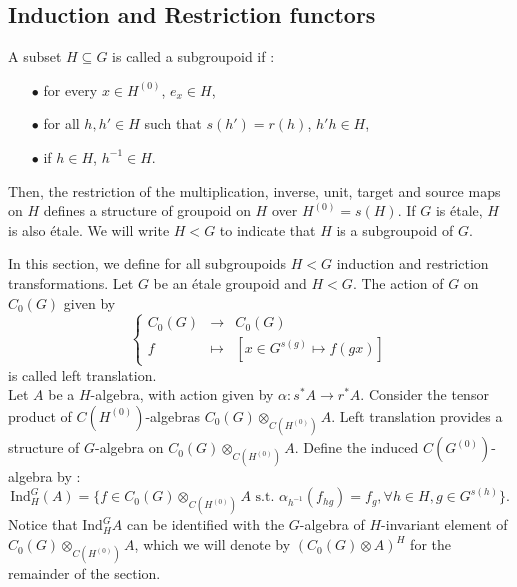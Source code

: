 \subsection{Induction and Restriction functors}

\begin{definition} A subset $H\subseteq G$ is called a subgroupoid if :
\begin{itemize}
\item[$\bullet$] for every $x\in H^{(0)}$, $e_x\in H$,
\item[$\bullet$] for all $h,h'\in H $ such that $s(h') = r(h)$, $h'h \in H$,
\item[$\bullet$] if $h\in H$, $h^{-1}\in H$.
\end{itemize}
Then, the restriction of the multiplication, inverse, unit, target and source maps on $H$ defines a structure of groupoid on $H$ over $H^{(0)} = s(H)$. If $G$ is étale, $H$ is also étale. We will write $H< G$ to indicate that $H$ is a subgroupoid of $G$.
\end{definition}

In this section, we define for all subgroupoids $H < G$ induction and restriction transformations. Let $G$ be an étale groupoid and $H<G$. The action of $G$ on $C_0(G)$ given by 
\[\left\{ \begin{array}{rcl}
C_0(G) & \rightarrow & C_0(G) \\
f & \mapsto  & [x\in G^{s(g)}\mapsto f(gx) ]
\end{array}\right.\] 
is called left translation.\\

Let $A$ be a $H$-algebra, with action given by $\alpha : s^*A \rightarrow r^* A$. Consider the tensor product of $C(H^{(0)})$-algebras $C_0(G)\otimes_{C(H^{(0)})} A$. Left translation provides a structure of $G$-algebra on $C_0(G)\otimes_{C(H^{(0)})} A$. Define the induced $C(G^{(0)})$-algebra by :
\[\text{Ind}_H^G (A) = \{f \in C_0(G)\otimes_{C(H^{(0)})} A \text{ s.t. } \alpha_{h^{-1}}(f_{hg}) = f_g,\forall h\in H,g\in G^{s(h)}\}. \]
Notice that $\text{Ind}_H^G A$ can be identified with the $G$-algebra of $H$-invariant element of $C_0(G)\otimes_{C(H^{(0)})} A$, which we will denote by $(C_0(G)\otimes A )^H$ for the remainder of the section.\\


